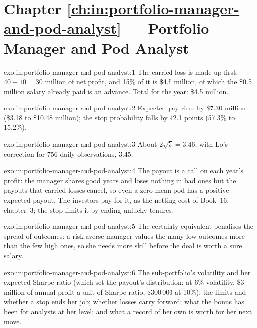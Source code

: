 \section*{Chapter \ref{ch:in:portfolio-manager-and-pod-analyst} --- Portfolio Manager and Pod Analyst}

\begin{solution}{exo:in:portfolio-manager-and-pod-analyst:1}
The carried loss is made up first: $40-10=30$ million of net profit, and 15\% of it is \$4.5 million, of which the \$0.5
million salary already paid is an advance. Total for the year: \$4.5 million.
\end{solution}

\begin{solution}{exo:in:portfolio-manager-and-pod-analyst:2}
Expected pay rises by \$7.30 million (\$3.18 to \$10.48 million); the stop probability falls by 42.1 points (57.3\% to
15.2\%).
\end{solution}

\begin{solution}{exo:in:portfolio-manager-and-pod-analyst:3}
About $2\sqrt3=3.46$; with Lo's correction for 756 daily observations, 3.45.
\end{solution}

\begin{solution}{exo:in:portfolio-manager-and-pod-analyst:4}
The payout is a call on each year's profit: the manager shares good years and loses nothing in bad ones but the payouts
that carried losses cancel, so even a zero-mean pod has a positive expected payout. The investors pay for it, as the
netting cost of Book~16, chapter~3; the stop limits it by ending unlucky tenures.
\end{solution}

\begin{solution}{exo:in:portfolio-manager-and-pod-analyst:5}
The certainty equivalent penalises the spread of outcomes: a risk-averse manager values the many low outcomes more than
the few high ones, so she needs more skill before the deal is worth a sure salary.
\end{solution}

\begin{solution}{exo:in:portfolio-manager-and-pod-analyst:6}
The sub-portfolio's volatility and her expected Sharpe ratio (which set the payout's distribution: at 6\% volatility,
\$3 million of annual profit a unit of Sharpe ratio, \$300\,000 at 10\%); the limits and whether a stop ends her job;
whether losses carry forward; what the bonus has been for analysts at her level; and what a record of her own is worth
for her next move.
\end{solution}

